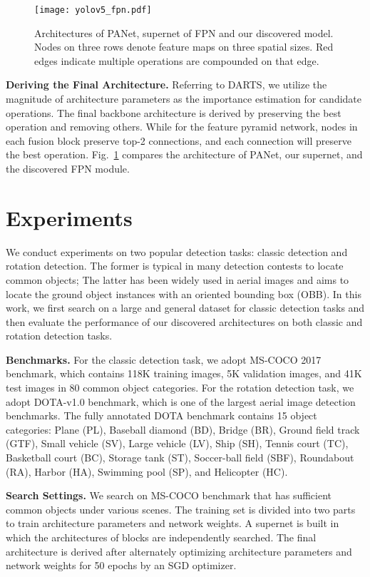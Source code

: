 \documentclass[letterpaper]{article} \usepackage{aaai22}  \usepackage{times}  \usepackage{helvet}  \usepackage{courier}  \usepackage[hyphens]{url}  \usepackage{graphicx} \urlstyle{rm} \def\UrlFont{\rm}  \usepackage{natbib}  \usepackage{caption} \DeclareCaptionStyle{ruled}{labelfont=normalfont,labelsep=colon,strut=off} \frenchspacing  \setlength{\pdfpagewidth}{8.5in}  \setlength{\pdfpageheight}{11in}
\begin{document}
\begin{figure}[tb]
    \centering
\texttt{[image: yolov5\_fpn.pdf]}
    \vspace{-8pt}
    \caption{Architectures of PANet, supernet of FPN and our discovered model. Nodes on three rows denote feature maps on three spatial sizes. Red edges indicate multiple operations are compounded on that edge.}
    \label{fig:derive_fpn}
\end{figure}
\textbf{Deriving the Final Architecture.}
Referring to DARTS, we utilize the magnitude of architecture parameters as the importance estimation for candidate operations. The final backbone architecture is derived by preserving the best operation and removing others. While for the feature pyramid network, nodes in each fusion block preserve top-2 connections, and each connection will preserve the best operation. Fig.~\ref{fig:derive_fpn} compares the architecture of PANet, our supernet, and the discovered FPN module.


\section{Experiments}
We conduct experiments on two popular detection tasks: classic detection and rotation detection. The former is typical in many detection contests to locate common objects; The latter has been widely used in aerial images and aims to locate the ground object instances with an oriented bounding box (OBB). In this work, we first search on a large and general dataset for classic detection tasks and then evaluate the performance of our discovered architectures on both classic and rotation detection tasks.

\textbf{Benchmarks.} 
For the classic detection task, we adopt MS-COCO 2017 benchmark, which contains 118K training images, 5K validation images, and 41K test images in 80 common object categories. 
For the rotation detection task, we adopt DOTA-v1.0 benchmark, which is one of the largest aerial image detection benchmarks. The fully annotated DOTA benchmark contains 15 object categories: Plane (PL), Baseball diamond (BD), Bridge (BR), Ground field track (GTF), Small vehicle (SV), Large vehicle (LV), Ship (SH), Tennis court (TC), Basketball court (BC), Storage tank (ST), Soccer-ball field (SBF), Roundabout (RA), Harbor (HA), Swimming pool (SP), and Helicopter (HC).

\textbf{Search Settings.}
We search on MS-COCO benchmark that has sufficient common objects under various scenes.
The training set is divided into two parts to train architecture parameters and network weights.
A supernet is built in which the architectures of blocks are independently searched. The final architecture is derived after alternately optimizing architecture parameters and network weights for 50 epochs by an SGD optimizer.
\end{document}
